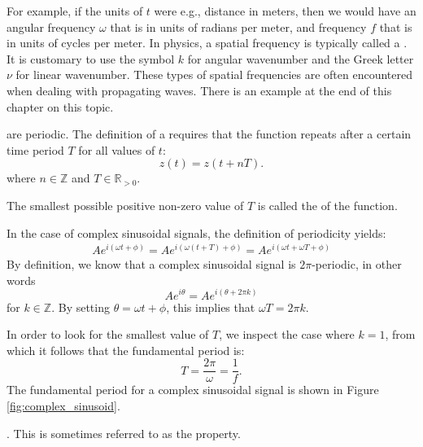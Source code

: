 For example, if the units of $t$ were e.g., distance in meters, then we would have an angular frequency $\omega$ that is in units of radians per meter, and frequency $f$ that is in units of cycles per meter. In physics, a spatial frequency is typically called a \emph{}. It is customary to use the symbol $k$ for angular wavenumber and the Greek letter $\nu$ for linear wavenumber. These types of spatial frequencies are often encountered when dealing with propagating waves. There is an example at the end of this chapter on this topic.

 are periodic. The definition of a  requires that the function repeats after a certain time period $T$ for all values of $t$:
\begin{equation}
\boxed{z(t) = z(t+ n T).}
\end{equation}
where $n \in \mathbb{Z}$ and $T \in \mathbb{R}_{>0}$.  

The smallest possible positive non-zero value of $T$ is called the \emph{} of the function. 

In the case of complex sinusoidal signals, the definition of periodicity yields:
\begin{align}
Ae^{i (\omega t + \phi)}= Ae^{i (\omega (t+T) + \phi)} = Ae^{i (\omega t+ \omega T + \phi)}
\end{align}
By definition, we know that a complex sinusoidal signal is
$2\pi$-periodic, in other words
\begin{equation}
Ae^{i\theta}=Ae^{i(\theta+2\pi k)}
\end{equation}
for $k\in\mathbb{Z}$. By setting $\theta = \omega t +\phi$, this implies that $\omega T = 2\pi k$.

In order to look for the smallest value of $T$, we inspect the case where $k=1$, from which it follows that the fundamental period is:
\begin{equation}
\boxed{T = \frac{2\pi}{\omega} = \frac{1}{f}.}
\end{equation}
The fundamental period for a complex sinusoidal signal is shown in Figure \ref{fig:complex_sinusoid}.

. This is sometimes referred to as the \emph{} property.

